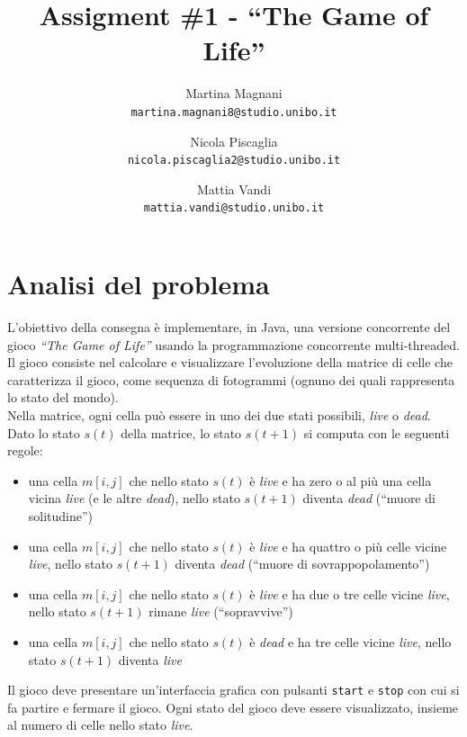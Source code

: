 ﻿\documentclass[a4paper]{article}
\title{\LARGE \bf
Assigment \#1 - ``The Game of Life''
}
\author{
    Martina Magnani\\
    \texttt{martina.magnani8@studio.unibo.it}
    \and
    Nicola Piscaglia\\
    \texttt{nicola.piscaglia2@studio.unibo.it}
    \and
    Mattia Vandi\\
    \texttt{mattia.vandi@studio.unibo.it}
}
\date{}
\begin{document}
\maketitle
\section{Analisi del problema}\label{analisi-del-problema}

L'obiettivo della consegna è implementare, in Java, una versione concorrente del gioco \textit{``The Game of Life''} usando la programmazione concorrente multi-threaded.\\
Il gioco consiste nel calcolare e visualizzare l'evoluzione della matrice di celle che caratterizza il gioco, come sequenza di fotogrammi (ognuno dei quali rappresenta lo stato del mondo).\\
Nella matrice, ogni cella può essere in uno dei due stati possibili, \textit{live} o \textit{dead}.\\
Dato lo stato \(s\left(t\right)\) della matrice, lo stato \(s\left(t + 1\right)\) si computa con le seguenti regole:

\begin{itemize}
\item
  una cella \(m\left[i,j\right]\) che nello stato \(s\left(t\right)\) è \textit{live} e ha zero o al più una cella vicina \textit{live} (e le altre \textit{dead}), nello stato \(s\left(t + 1\right)\) diventa \textit{dead} (``muore di solitudine'')
\item
  una cella \(m\left[i,j\right]\) che nello stato \(s\left(t\right)\) è \textit{live} e ha quattro o più celle vicine \textit{live}, nello stato \(s\left(t + 1\right)\) diventa \textit{dead} (``muore di sovrappopolamento'')
\item
  una cella \(m\left[i,j\right]\) che nello stato \(s\left(t\right)\) è \textit{live} e ha due o tre celle vicine \textit{live}, nello stato \(s\left(t + 1\right)\) rimane \textit{live} (``sopravvive'')
\item
  una cella \(m\left[i,j\right]\) che nello stato \(s\left(t\right)\) è \textit{dead} e ha tre celle vicine \textit{live}, nello stato \(s\left(t + 1\right)\) diventa \textit{live}
\end{itemize}
Il gioco deve presentare un'interfaccia grafica con pulsanti \texttt{start} e \texttt{stop} con cui si fa partire e fermare il gioco.
Ogni stato del gioco deve essere visualizzato, insieme al numero di celle nello stato \textit{live}.
\end{document}
